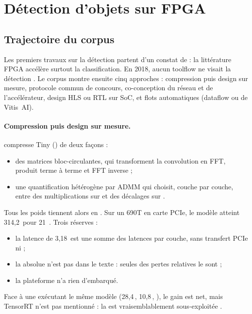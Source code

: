 \section{Détection d'objets sur FPGA}
\label{sec:detection}

\subsection{Trajectoire du corpus}

Les premiers travaux sur la détection partent d'un constat de
\citet[§1]{2019-ding-req-yolo-resource-aware-efficient} : la littérature FPGA accélère
surtout la classification. En 2018, aucun toolflow ne visait la détection
\citep[§2.6, §3.1]{2018-venieris-toolflows-mapping-convolutional-neural-networks}. Le
corpus montre ensuite cinq approches : compression puis design sur mesure, protocole commun
de concours, co-conception du réseau et de l'accélérateur, design HLS ou RTL sur SoC, et
flots automatiques (dataflow ou  de Vitis~AI).

\paragraph{Compression puis design sur mesure.}  compresse Tiny  ()
de deux façons :
\begin{itemize}
  \item des matrices bloc-circulantes, qui transforment la convolution en FFT, produit
    terme à terme et FFT inverse  ;
  \item une quantification hétérogène par ADMM qui choisit, couche par couche, entre des
    multiplications sur  et des décalages sur  .
\end{itemize}
Tous les poids tiennent alors en  . Sur un  690T en carte PCIe, le
modèle atteint 314,2\, pour 21\, . Trois réserves :
\begin{itemize}
  \item la latence de 3,18\, est une somme des latences par couche, sans transfert PCIe
    ni   ;
  \item la  absolue n'est pas dans le texte : seules des pertes relatives le sont
     ;
  \item la plateforme n'a rien d'embarqué.
\end{itemize}
Face à une  exécutant le même modèle (28,4\,, 10,8\,, ), le
gain est net, mais TensorRT n'est pas mentionné : la  est vraisemblablement
sous-exploitée \deduit.

